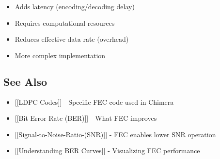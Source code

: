 \begin{itemize}
\tightlist
\item
  Adds latency (encoding/decoding delay)
\item
  Requires computational resources
\item
  Reduces effective data rate (overhead)
\item
  More complex implementation
\end{itemize}

\subsection{See Also}\label{see-also}

\begin{itemize}
\tightlist
\item
  {[}{[}LDPC-Codes{]}{]} - Specific FEC code used in Chimera
\item
  {[}{[}Bit-Error-Rate-(BER){]}{]} - What FEC improves
\item
  {[}{[}Signal-to-Noise-Ratio-(SNR){]}{]} - FEC enables lower SNR
  operation
\item
  {[}{[}Understanding BER Curves{]}{]} - Visualizing FEC performance
\end{itemize}
